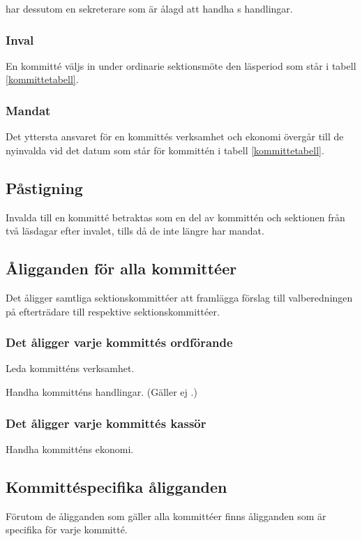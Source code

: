 \ARMIT{} har dessutom en sekreterare som är ålagd att handha \ARMIT{}s handlingar. 

\subsubsection{Inval}
En kommitté väljs in under ordinarie sektionsmöte den läsperiod som står i tabell \ref{kommittetabell}. 

\subsubsection{Mandat} \label{mandat}
Det yttersta ansvaret för en kommittés verksamhet och ekonomi övergår till de nyinvalda vid det datum som står för kommittén i tabell \ref{kommittetabell}.

\subsection{Påstigning}

Invalda till en kommitté betraktas som en del av kommittén och sektionen från två läsdagar efter invalet, tills då de inte längre har mandat.

\subsection{Åligganden för alla kommittéer}
Det åligger samtliga sektionskommittéer att framlägga förslag till valberedningen på efterträdare till respektive sektionskommittéer. 

\subsubsection{Det åligger varje kommittés ordförande}
\begin{att}
	\item Leda kommitténs verksamhet.
	\item Handha kommitténs handlingar. (Gäller ej \ARMIT{}.)
\end{att}

\subsubsection{Det åligger varje kommittés kassör}
\begin{att}
	\item Handha kommitténs ekonomi.
\end{att}

\subsection{Kommittéspecifika åligganden}
Förutom de åligganden som gäller alla kommittéer finns åligganden som är specifika för varje kommitté.

